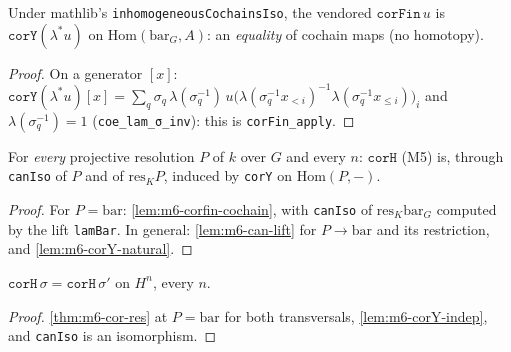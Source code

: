 \begin{lemma}\label{lem:m6-corfin-cochain}
  \leanok
  Under mathlib's \texttt{inhomogeneousCochainsIso}, the vendored $\texttt{corFin}\,u$ is $\texttt{corY}(\lambda^*u)$ on
  $\mathrm{Hom}(\mathrm{bar}_G,A)$: an \emph{equality} of cochain maps (no homotopy).
\end{lemma}
\begin{proof}
  \leanok
  On a generator $[x]$: $\texttt{corY}(\lambda^*u)[x]=\sum_q\sigma_q\,\lambda(\sigma_q^{-1})\,u\bigl(\lambda(\sigma_q^{-1}x_{<i})^{-1}
  \lambda(\sigma_q^{-1}x_{\le i})\bigr)_i$ and $\lambda(\sigma_q^{-1})=1$ (\texttt{coe\_lam\_σ\_inv}): this is \texttt{corFin\_apply}.
\end{proof}

\begin{theorem}\label{thm:m6-cor-res}
  \leanok
  For \emph{every} projective resolution $P$ of $k$ over $G$ and every $n$: $\texttt{corH}$ (M5) is, through \texttt{canIso} of $P$ and of
  $\mathrm{res}_KP$, induced by \texttt{corY} on $\mathrm{Hom}(P,-)$.
\end{theorem}
\begin{proof}
  \leanok
  For $P=\mathrm{bar}$: \ref{lem:m6-corfin-cochain}, with \texttt{canIso} of $\mathrm{res}_K\mathrm{bar}_G$ computed by the lift
  \texttt{lamBar}. In general: \ref{lem:m6-can-lift} for $P\to\mathrm{bar}$ and its restriction, and \ref{lem:m6-corY-natural}.
\end{proof}

\begin{theorem}\label{thm:m6-corH-indep}
  \leanok
  $\texttt{corH}\,\sigma=\texttt{corH}\,\sigma'$ on $H^n$, every $n$.
\end{theorem}
\begin{proof}
  \leanok
  \ref{thm:m6-cor-res} at $P=\mathrm{bar}$ for both transversals, \ref{lem:m6-corY-indep}, and \texttt{canIso} is an isomorphism.
\end{proof}

